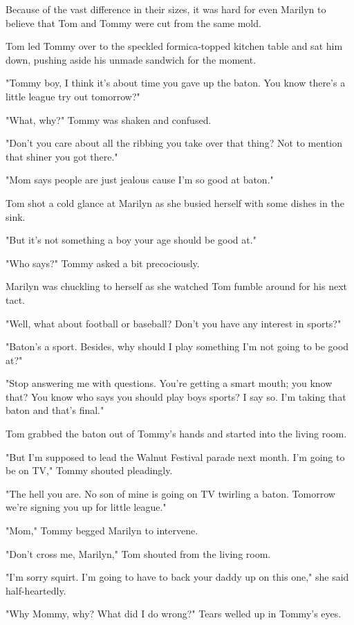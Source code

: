 \documentclass[10pt,a4paper]{article}
\begin{document}
Because of the vast difference in their sizes, it was hard for even Marilyn to believe that Tom and Tommy were cut from the same mold.

Tom led Tommy over to the speckled formica-topped kitchen table and sat him down, pushing aside his unmade sandwich for the moment.

"Tommy boy, I think it's about time you gave up the baton. You know there's a little league try out tomorrow?"

"What, why?" Tommy was shaken and confused.

"Don't you care about all the ribbing you take over that thing? Not to mention that shiner you got there."

"Mom says people are just jealous cause I'm so good at baton."

Tom shot a cold glance at Marilyn as she busied herself with some dishes in the sink.

"But it's not something a boy your age should be good at."

"Who says?" Tommy asked a bit precociously.

Marilyn was chuckling to herself as she watched Tom fumble around for his next tact.

"Well, what about football or baseball? Don't you have any interest in sports?"

"Baton's a sport. Besides, why should I play something I'm not going to be good at?"

"Stop answering me with questions. You're getting a smart mouth; you know that? You know who says you should play boys sports? I say so. I'm taking that baton and that's final."

Tom grabbed the baton out of Tommy's hands and started into the living room.

"But I'm supposed to lead the Walnut Festival parade next month. I'm going to be on TV," Tommy shouted pleadingly.

"The hell you are. No son of mine is going on TV twirling a baton. Tomorrow we're signing you up for little league."

"Mom," Tommy begged Marilyn to intervene.

"Don't cross me, Marilyn," Tom shouted from the living room.

"I'm sorry squirt. I'm going to have to back your daddy up on this one," she said half-heartedly.

"Why Mommy, why? What did I do wrong?" Tears welled up in Tommy's eyes.
\end{document}
